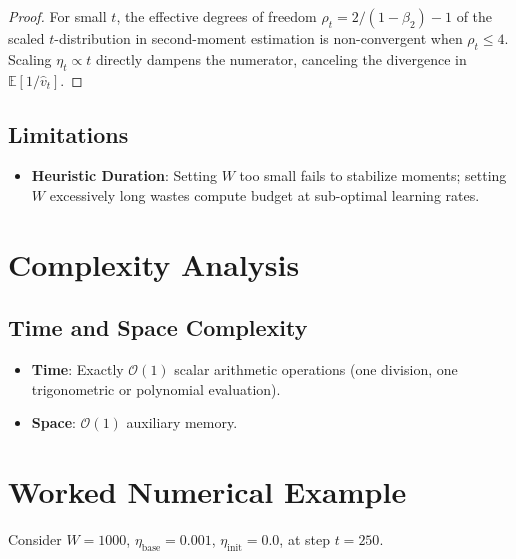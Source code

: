 \documentclass[11pt,a4paper]{article}
\theoremstyle{definition}
\begin{document}
\begin{proof}
For small $t$, the effective degrees of freedom $\rho_t = 2 / (1 - \beta_2) - 1$ of the scaled $t$-distribution in second-moment estimation is non-convergent when $\rho_t \le 4$. Scaling $\eta_t \propto t$ directly dampens the numerator, canceling the divergence in $\mathbb{E}[1 / \hat{v}_t]$.
\end{proof}

\subsection{Limitations}
\begin{itemize}
    \item \textbf{Heuristic Duration}: Setting $W$ too small fails to stabilize moments; setting $W$ excessively long wastes compute budget at sub-optimal learning rates.
\end{itemize}

\section{Complexity Analysis}

\subsection{Time and Space Complexity}
\begin{itemize}
    \item \textbf{Time}: Exactly $\mathcal{O}(1)$ scalar arithmetic operations (one division, one trigonometric or polynomial evaluation).
    \item \textbf{Space}: $\mathcal{O}(1)$ auxiliary memory.
\end{itemize}

\section{Worked Numerical Example}

Consider $W = 1000$, $\eta_{\text{base}} = 0.001$, $\eta_{\text{init}} = 0.0$, at step $t = 250$.
\end{document}
